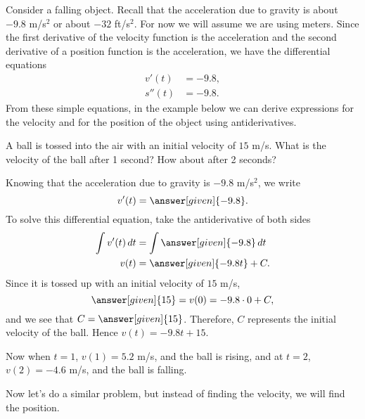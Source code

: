 \documentclass{ximera}
\begin{document}
Consider a falling object. Recall that the acceleration due to gravity is about $-9.8$
m/s$^2$ or about $-32$ ft/s$^2$. For now we will assume we are using meters. Since the first derivative of the velocity function 
is the acceleration and the
second derivative of a position function 
is the acceleration, we have the differential equations
\begin{align*}
v'(t) &=  -9.8,\\
s''(t) &=  -9.8.
\end{align*}
From these simple equations, in the example below we can derive expressions for the velocity
and for the position of the object using antiderivatives.


\begin{example}
A ball is tossed into the air with an initial velocity of $15$
m/s. What is the velocity of the ball after 1 second? How about after
2 seconds?
\begin{explanation}
Knowing that the acceleration due to gravity is $-9.8$ m/s$^2$, we write
\[
v'(t) = \answer[given]{-9.8}.
\]
To solve this differential equation, take the antiderivative of both sides
\begin{align*}
\int v'(t) \d t &= \int \answer[given]{-9.8} \d t\\
v(t) &= \answer[given]{-9.8 t} + C.
\end{align*}
 Since it is
tossed up with an initial velocity of $15$ m/s, 
\[
\answer[given]{15} = v(0) = -9.8\cdot 0 + C,
\]
and we see that $C=\answer[given]{15}$. Therefore, $C$ represents the initial velocity of the ball.
Hence $v(t) = -9.8t + 15$. 

Now when $t=1$,
$v(1) = 5.2$ m/s, and the ball is rising, and at $t=2$, $v(2) = -4.6$ m/s,
and the ball is falling.
\end{explanation}
\end{example}

Now let's do a similar problem, but instead of finding the velocity,
we will find the position.
\end{document}
